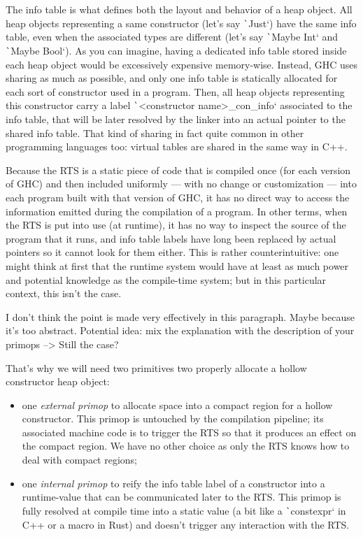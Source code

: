 \documentclass[english]{jflart}
\newcommand{\TODO}[1]{{\color{red}\large #1}}
\begin{document}
The info table is what defines both the layout and behavior of a heap object. All heap objects representing a same constructor (let's say \texttt`Just`) have the same info table, even when the associated types are different (let's say \texttt`Maybe Int` and \texttt`Maybe Bool`). As you can imagine, having a dedicated info table stored inside each heap object would be excessively expensive memory-wise. Instead, GHC uses sharing as much as possible, and only one info table is statically allocated for each sort of constructor used in a program. Then, all heap objects representing this constructor carry a label \texttt`<constructor name>_con_info` associated to the info table, that will be later resolved by the linker into an actual pointer to the shared info table. That kind of sharing in fact quite common in other programming languages too: virtual tables are shared in the same way in C++.

Because the RTS is a static piece of code that is compiled once (for each version of GHC) and then included uniformly --- with no change or customization --- into each program built with that version of GHC, it has no direct way to access the information emitted during the compilation of a program. In other terms, when the RTS is put into use (at runtime), it has no way to inspect the source of the program that it runs, and info table labels have long been replaced by actual pointers so it cannot look for them either. This is rather counterintuitive: one might think at first that the runtime system would have at least as much power and potential knowledge as the compile-time system; but in this particular context, this isn't the case.

\TODO{I don't think the point is made very effectively in this paragraph. Maybe because it's too abstract. Potential idea: mix the explanation with the description of your primops --> Still the case?}

That's why we will need two primitives two properly allocate a hollow constructor heap object:

\begin{itemize}
\item one \emph{external primop} to allocate space into a compact region for a hollow constructor. This primop is untouched by the compilation pipeline; its associated machine code is to trigger the RTS so that it produces an effect on the compact region. We have no other choice as only the RTS knows how to deal with compact regions;
\item one \emph{internal primop} to reify the info table label of a constructor into a runtime-value that can be communicated later to the RTS. This primop is fully resolved at compile time into a static value (a bit like a \texttt`constexpr` in C++ or a macro in Rust) and doesn't trigger any interaction with the RTS.
\end{itemize}
\end{document}
